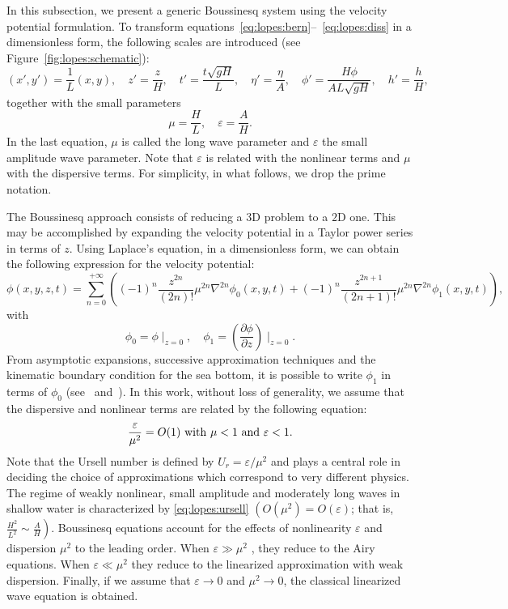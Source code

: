 In this subsection, we present a generic Boussinesq system using the
velocity potential formulation.  To transform
equations~\eqref{eq:lopes:bern}--~\eqref{eq:lopes:diss} in a
dimensionless form, the following scales are introduced (see
Figure~\ref{fig:lopes:schematic}):
\begin{equation}
( x', y')=\frac{1}{L}(x,y),\quad z'=\frac{z}{H}, \quad
t'=\frac{t\sqrt{gH}}{L},\quad \eta'=\frac{\eta}{A},\quad
\phi'= \frac{H\phi}{AL\sqrt{gH}},\quad h'=\frac{h}{H},
\end{equation}
together with the small parameters
\begin{equation}
  \mu=\frac{H}{L},\quad \varepsilon=\frac{A}{H}.
\end{equation}
In the last equation, $\mu$ is called the long wave parameter and
$\varepsilon$ the small amplitude wave parameter.  Note that
$\varepsilon$ is related with the nonlinear terms and $\mu$ with the
dispersive terms.  For simplicity, in what follows, we drop the prime
notation.

The Boussinesq approach consists of reducing a $3$D problem to a $2$D
one.  This may be accomplished by expanding the velocity potential in
a Taylor power series in terms of $z$.  Using Laplace's equation, in a
dimensionless form, we can obtain the following expression for the
velocity potential:
\begin{equation}
\phi(x,y,z,t) = \sum_{n=0}^{+\infty} \left((-1)^n \frac{z^{2n}}{(2n)!}
  \mu^{2n}\nabla^{2n}\phi_0(x,y,t) + (-1)^n \frac{z^{2n+1}}{(2n+1)!}
  \mu^{2n}\nabla^{2n}\phi_1(x,y,t)\right),
\end{equation}
with
\begin{equation}
  \phi_0=\phi\mid_{ z=0},\quad
  \phi_1=\left(\frac{\partial \phi}{\partial z}\right)\mid_{z=0}\!.
\end{equation}
From asymptotic expansions, successive approximation techniques and
the kinematic boundary condition for the sea bottom, it is possible to
write $\phi_1$ in terms of $\phi_0$ (see~\citet{ChenLiu1994}
and~\citet{ZhaoTengCheng2004}).  In this work, without loss of
generality, we assume that the dispersive and nonlinear terms are
related by the following equation:
\begin{equation}
  \label{eq:lopes:ursell}
  \frac{\varepsilon}{\mu^2}=O(1)\ {\rm with}\ \mu<1\ {\rm
    and}\ \varepsilon<1.
\end{equation}
Note that the Ursell number is defined by $U_r = \varepsilon/\mu^2$
and plays a central role in deciding the choice of approximations
which correspond to very different physics.  The regime of weakly
nonlinear, small amplitude and moderately long waves in shallow water
is characterized by \eqref{eq:lopes:ursell}
$\left(O(\mu^2)=O(\varepsilon)\right.$; that is,
$\left.\frac{H^2}{L^2}\sim\frac{A}{H} \right)$. Boussinesq equations
account for the effects of nonlinearity $\varepsilon$ and dispersion
$\mu^2$ to the leading order.  When $\varepsilon\gg \mu^2$ , they
reduce to the Airy equations.  When $\varepsilon\ll \mu^2$ they reduce
to the linearized approximation with weak dispersion.  Finally, if we
assume that $\varepsilon\rightarrow 0$ and $\mu^2\rightarrow 0$, the
classical linearized wave equation is obtained.

